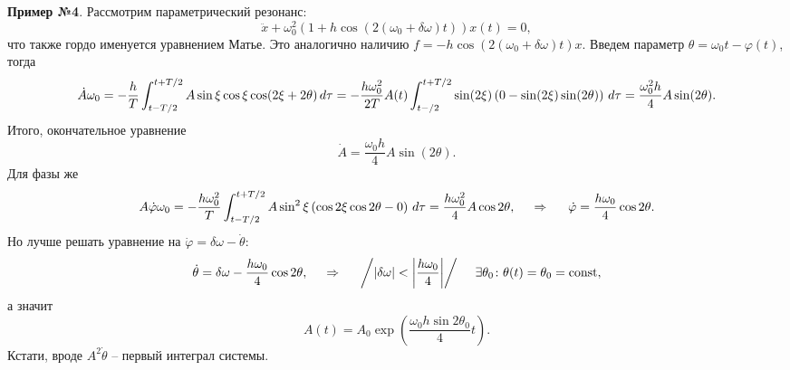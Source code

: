 \textbf{Пример №4}. Рассмотрим параметрический резонанс:
\begin{equation*}
    \ddot{x} + \omega_0^2 \left(1 + h \cos\left(2(\omega_0 + \delta \omega) t\right)\right) x(t) = 0,
\end{equation*}
что также гордо именуется уравнением Матье. Это аналогично наличию $f = - h \cos(2 (\omega_0 +\delta \omega) t) x$.  Введем параметр $\theta = \omega_0 t - \varphi(t)$, тогда
\begin{equation*}
    \dot{A} \omega_0 = - \frac{h}{T} \int_{t-T/2}^{t+T/2} A \sin \xi \cos \xi \cos(2 \xi + 2 \theta) \, d \tau = - \frac{h \omega_0^2}{2T} A(t) \int_{t-/2}^{t+T/2} \sin(2 \xi) \left(
        0 - \sin(2 \xi) \sin(2 \theta)
    \right) \, d \tau = \frac{\omega_0^2 h}{4}A \sin(2 \theta).
\end{equation*}
Итого, окончательное уравнение
\begin{equation*}
    \dot{A} = \frac{\omega_0 h}{4} A \sin(2 \theta).
\end{equation*}
Для фазы же
\begin{equation*}
    A \dot{\varphi} \omega_0  = - \frac{h \omega_0^2}{T} \int_{t-T/2}^{t+T/2} A \sin^2 \xi \left(
        \cos 2 \xi \cos 2 \theta - 0
    \right) \, d \tau = \frac{h \omega_0^2}{4} A \cos 2 \theta,
    \hspace{0.5cm} \Rightarrow \hspace{0.5cm}
    \dot{\varphi} = \frac{h \omega_0}{4} \cos 2 \theta.
\end{equation*}
Но лучше решать уравнение на $\dot{\varphi} = \delta \omega - \dot{\theta}$:
\begin{equation*}
    \dot{\theta} = \delta \omega - \frac{h \omega_0}{4} \cos 2 \theta,
    \hspace{0.5cm} \Rightarrow \hspace{0.5cm}
    \bigg/ |\delta \omega| < \bigg| \frac{h \omega_0}{4} \bigg| \bigg/
    \hspace{5 mm} 
    \exists \theta_0 \colon  \theta(t) = \theta_0 = \textnormal{const},
\end{equation*}
а значит
\begin{equation*}
    A(t) = A_0 \exp\left(
        \frac{\omega_0 h \sin 2 \theta_0}{4} t
    \right).
\end{equation*}
Кстати, вроде $A^2 \dot{\theta}$ -- первый интеграл системы.


